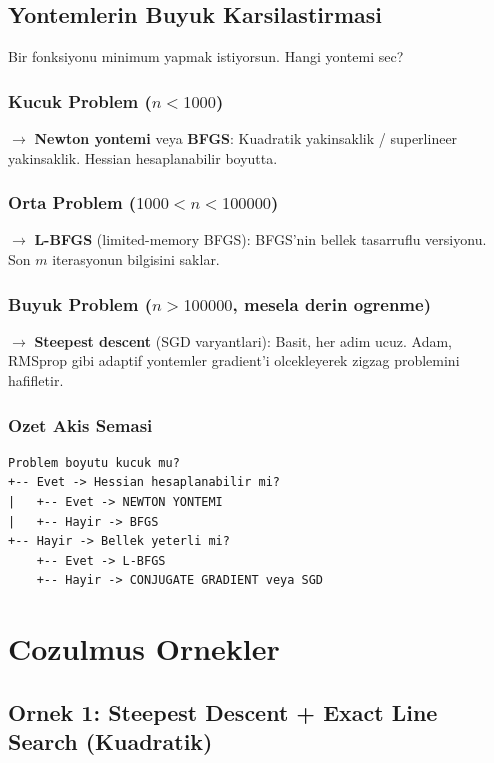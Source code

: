 \documentclass[12pt,a4paper]{article}
\theoremstyle{definition}
\theoremstyle{remark}
\begin{document}
\subsection{Yontemlerin Buyuk Karsilastirmasi}

Bir fonksiyonu minimum yapmak istiyorsun. Hangi yontemi sec?

\subsubsection{Kucuk Problem ($n < 1000$)}
$\rightarrow$ \textbf{Newton yontemi} veya \textbf{BFGS}: Kuadratik yakinsaklik / superlineer yakinsaklik. Hessian hesaplanabilir boyutta.

\subsubsection{Orta Problem ($1000 < n < 100000$)}
$\rightarrow$ \textbf{L-BFGS} (limited-memory BFGS): BFGS'nin bellek tasarruflu versiyonu. Son $m$ iterasyonun bilgisini saklar.

\subsubsection{Buyuk Problem ($n > 100000$, mesela derin ogrenme)}
$\rightarrow$ \textbf{Steepest descent} (SGD varyantlari): Basit, her adim ucuz. Adam, RMSprop gibi adaptif yontemler gradient'i olcekleyerek zigzag problemini hafifletir.

\subsubsection{Ozet Akis Semasi}

\begin{Verbatim}[frame=single, fontsize=\small]
Problem boyutu kucuk mu?
+-- Evet -> Hessian hesaplanabilir mi?
|   +-- Evet -> NEWTON YONTEMI
|   +-- Hayir -> BFGS
+-- Hayir -> Bellek yeterli mi?
    +-- Evet -> L-BFGS
    +-- Hayir -> CONJUGATE GRADIENT veya SGD
\end{Verbatim}


\newpage
\section{Cozulmus Ornekler}

\subsection{Ornek 1: Steepest Descent + Exact Line Search (Kuadratik)}
\end{document}
